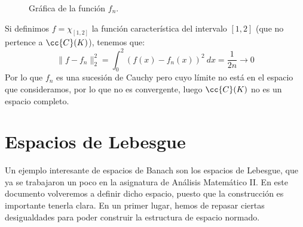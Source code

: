 \begin{itemize}
\begin{figure}[H]
            \caption{Gráfica de la función $f_n$.}
            \label{fig:no_hilbert}
        \end{figure}
        Si definimos $f=  \chi_{[1,2]}$ la función característica del intervalo $[1,2]$ (que no pertence a $\cc{C}(K)$), tenemos que:
        \begin{equation*}
            \|f-f_n\|_2^2 = \int_{0}^{2} {(f(x)- f_n(x))}^{2}~dx  = \dfrac{1}{2n} \to 0
        \end{equation*}
        Por lo que $f_n$ es una sucesión de Cauchy pero cuyo límite no está en el espacio que consideramos, por lo que no es convergente, luego $\cc{C}(K)$ no es un espacio completo. %
\end{itemize}

\section{Espacios de Lebesgue}
Un ejemplo interesante de espacios de Banach son los espacios de Lebesgue, que ya se trabajaron un poco en la asignatura de Análisis Matemático II. En este documento volveremos a definir dicho espacio, puesto que la construcción es importante tenerla clara. En un primer lugar, hemos de repasar ciertas desigualdades para poder construir la estructura de espacio normado.


